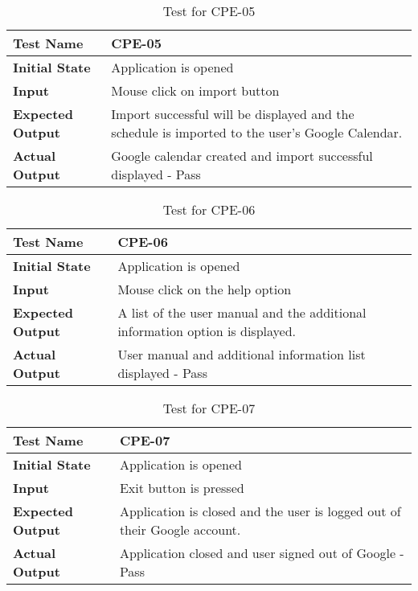 \documentclass[12pt, titlepage]{article}
\begin{document}
				
		\begin{table}[!htbp]
			
			\begin{tabularx}{\textwidth}{|l|X|}
				\hline
				
				\textbf{Test Name} & CPE-05
				\\ 
				\hline
				\textbf{Initial State} & Application is opened \\ 
				\hline
				\textbf{Input} & Mouse click on import button  \\ 
				\hline 
				\textbf{Expected Output} & Import  successful  will  be  displayed  and  the  schedule  is  imported to the user’s Google Calendar. \\ 
				\hline
				\textbf{Actual Output} & Google calendar created and import successful displayed - Pass\\
				\hline
			\end{tabularx}
			\caption{Test for CPE-05}
			\label{Table}
		\end{table}

		\begin{table}[!htbp]
			
			\begin{tabularx}{\textwidth}{|l|X|}
				\hline
				
				\textbf{Test Name} & CPE-06
				\\ 
				\hline
				\textbf{Initial State} & Application is opened \\ 
				\hline
				\textbf{Input} & Mouse click on the help option\\ 
				\hline 
				\textbf{Expected Output} &  A list of the  user  manual  and  the additional  information  option  is displayed. \\ 
				\hline
				\textbf{Actual Output} & User manual and additional information list displayed - Pass\\
				\hline
			\end{tabularx}
			\caption{Test for CPE-06}
			\label{Table}
		\end{table}	


		\begin{table}[!htbp]
			
			\begin{tabularx}{\textwidth}{|l|X|}
				\hline
				
				\textbf{Test Name} & CPE-07
				\\ 
				\hline
				\textbf{Initial State} & Application is opened \\ 
				\hline
				\textbf{Input} & Exit button is pressed\\ 
				\hline 
				\textbf{Expected Output} &  Application is closed and the user is logged out of their Google account. \\ 
				\hline
				\textbf{Actual Output} & Application closed and user signed out of Google - Pass\\
				\hline
			\end{tabularx}
			\caption{Test for CPE-07}
			\label{Table}
		\end{table}	
		
\end{document}
